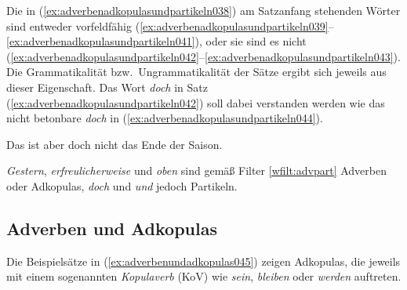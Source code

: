 
Die in (\ref{ex:adverbenadkopulasundpartikeln038}) am Satzanfang stehenden Wörter sind entweder vorfeldfähig (\ref{ex:adverbenadkopulasundpartikeln039}--\ref{ex:adverbenadkopulasundpartikeln041}), oder sie sind es nicht (\ref{ex:adverbenadkopulasundpartikeln042}--\ref{ex:adverbenadkopulasundpartikeln043}).
Die Grammatikalität bzw.\ Ungrammatikalität der Sätze ergibt sich jeweils aus dieser Eigenschaft.
Das Wort \textit{doch} in Satz (\ref{ex:adverbenadkopulasundpartikeln042}) soll dabei verstanden werden wie das nicht betonbare \textit{doch} in (\ref{ex:adverbenadkopulasundpartikeln044}).

\begin{exe}
  \ex\label{ex:adverbenadkopulasundpartikeln038}
  \begin{xlist}
  \end{xlist}
  \ex\label{ex:adverbenadkopulasundpartikeln044} Das ist aber doch nicht das Ende der Saison.
\end{exe}

\textit{Gestern}, \textit{erfreulicherweise} und \textit{oben} sind gemäß Filter \ref{wfilt:advpart} Adverben oder Adkopulas, \textit{doch} und \textit{und} jedoch Partikeln.


\subsection{Adverben und Adkopulas}
\label{sec:adverbenundadkopulas}


Die Beispielsätze in (\ref{ex:adverbenundadkopulas045}) zeigen Adkopulas, die jeweils mit einem sogenannten \textit{Kopulaverb} (KoV) wie \textit{sein}, \textit{bleiben} oder \textit{werden} auftreten.

